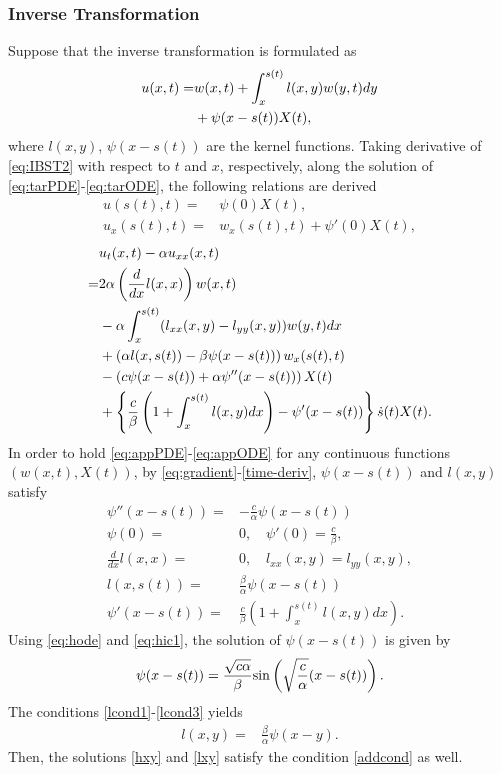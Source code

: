 \documentclass[journal]{IEEEtran}
\begin{document}
\subsubsection{Inverse Transformation}\label{appIBST}
Suppose that the inverse transformation is formulated as
\begin{align}\label{eq:IBST2}
u(x,t) =& w(x,t) +\int_x^{s(t)} l(x,y)w(y,t) dy\notag\\
&+ \psi(x-s(t)) X(t),
\end{align}
where $l(x,y)$, $\psi(x-s(t))$ are the kernel functions. Taking derivative of \eqref{eq:IBST2} with respect to $t$ and $x$, respectively, along the solution of \eqref{eq:tarPDE}-\eqref{eq:tarODE}, the following relations are derived  
\begin{align}\label{eq:gradient}
u(s(t),t) =& \psi(0) X(t), \\
u_x(s(t),t) =& w_x(s(t),t) +\psi'(0)X(t),
\end{align}
\begin{align}\label{time-deriv}
&u_t(x,t) -\alpha u_{xx}(x,t) \notag\\
= & 2\alpha \left(\frac{d}{dx}l(x,x)\right)w(x,t)\notag\\
&-\alpha \int_x^{s(t)} (l_{xx}(x,y)-l_{yy}(x,y))w(y,t) dx\nonumber\\
&+\left(\alpha l(x,s(t)) - \beta\psi(x-s(t))\right)w_x(s(t),t)\notag\\
&- \left(c\psi(x-s(t))+\alpha \psi''(x-s(t))\right) X(t)\nonumber\\
&+\left\{\frac{c}{\beta}\left(1+\int_x^{s(t)} l(x,y) dx\right)-\psi'(x-s(t))\right\}\dot{s}(t) X(t).
\end{align}
In order to hold \eqref{eq:appPDE}-\eqref{eq:appODE} for any continuous functions $(w(x,t), X(t))$, by \eqref{eq:gradient}-\eqref{time-deriv}, $\psi(x-s(t))$ and $l(x,y)$ satisfy 
\begin{align}
\label{eq:hode}
\psi''(x-s(t)) =& -\frac{c}{\alpha} \psi(x-s(t))\\
\label{eq:hic1}
\psi(0) =& 0, \quad  \psi'(0) = \frac{c}{\beta},\\
\label{lcond1}\frac{d}{dx}l(x,x)=&0, \quad l_{xx}(x,y)=l_{yy}(x,y),\\
\label{lcond3} l(x,s(t)) =& \frac{\beta}{\alpha} \psi(x-s(t))\\
\label{addcond}\psi'(x-s(t))=& \frac{c}{\beta}\left(1+\int_x^{s(t)} l(x,y) dx\right).
 \end{align}
Using \eqref{eq:hode} and \eqref{eq:hic1}, the solution of $\psi(x-s(t))$ is given by
\begin{align}\label{hxy}
\psi(x-s(t)) = \frac{\sqrt{c\alpha}}{\beta} {\rm sin}\left( \sqrt{\frac{c}{\alpha}}(x-s(t))\right). 
\end{align}
The conditions \eqref{lcond1}-\eqref{lcond3} yields
\begin{align}\label{lxy}
l(x,y)=&\frac{\beta}{\alpha} \psi(x-y).
\end{align}
Then, the solutions \eqref{hxy} and \eqref{lxy} satisfy the condition \eqref{addcond} as well. 
\end{document}
